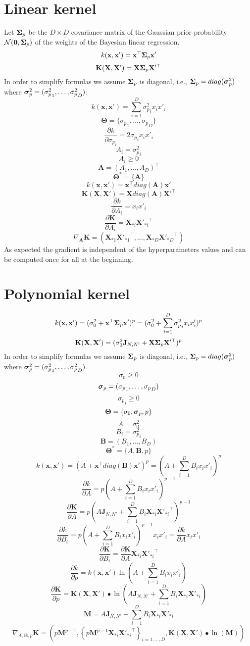 \documentclass[a4paper,11pt]{article}
\newcommand\x{{\mathbf x}}
\newcommand\X{{\mathbf X}}
\newcommand\K{{\mathbf K}}
\newcommand{\Ivec}[1]{\mbox{\boldmath $#1$}}
\begin{document}
\section{Linear kernel}
Let $\Ivec{\Sigma}_p$ be the $D \times D$ covariance matrix of the Gaussian
prior probability $\mathcal{N}(\Ivec{0},\Ivec{\Sigma}_p)$ of the weights of
the Bayesian linear regression.
$$k(\x,\x') = \x^{\top} \Ivec{\Sigma}_p \x'$$
$$\K(\X,\X') = \X \Ivec{\Sigma}_p \X'^{\top}$$
In order to simplify formulas we assume $\Ivec{\Sigma}_p$ is diagonal, i.e.,
$\Ivec{\Sigma}_p = diag(\Ivec{\sigma}^2_p)$ where $\Ivec{\sigma}^2_p =
({\sigma^2_p}_1,\ldots,{\sigma^2_p}_D)$:
$$k(\x,\x') = \sum_{i=1}^D {\sigma^2_p}_i x_i x'_i$$
$$\mathbf{\Theta} = \{{\sigma_p}_1,\ldots,{\sigma_p}_D\}$$
$$\frac{\partial k}{\partial {\sigma_p}_i} = 2 {\sigma_p}_i x_i x'_i$$
$$A_i = {\sigma_p^2}_i$$
$$A_i \ge 0$$
$$\mathbf{A} = (A_1,\ldots,A_D)^{\top}$$
$$\mathbf{\Theta}^* = \{ \mathbf{A} \}$$
$$k(\x,\x') = \x^{\top} diag(\mathbf{A}) \x'$$
$$\K(\X,\X') = \X diag(\mathbf{A}) \X'^{\top}$$
$$\frac{\partial k}{\partial A_i} = x_i x'_i$$
$$\frac{\partial \K}{\partial A_i} = \X_{* i} {\X'_{* i}}^{\top}$$
$$\nabla_{\mathbf{A}} \K = ( \X_{* 1} {\X'_{* 1}}^{\top}, \ldots,
\X_{* D} {\X'_{* D}}^{\top})$$
As expected the gradient is independent of the hyperparameters values
and can be computed once for all at the beginning.

\section{Polynomial kernel}
$$k(\x,\x') = (\sigma_0^2 + \x^{\top} \Ivec{\Sigma}_p \x')^p =
(\sigma_0^2 + \sum_{i=1}^D {\sigma^2_p}_i x_i x'_i)^p$$
$$\K(\X,\X') = (\sigma_0^2 \mathbf{J}_{N,N'} + \X \Ivec{\Sigma}_p
\X'^{\top})^p$$
In order to simplify formulas we assume $\Ivec{\Sigma}_p$ is diagonal, i.e.,
$\Ivec{\Sigma}_p = diag(\Ivec{\sigma}^2_p)$ where $\Ivec{\sigma}^2_p =
({\sigma^2_p}_1,\ldots,{\sigma^2_p}_D)$.
$$\sigma_0 \ge 0$$
$$\Ivec{\sigma}_p = ({\sigma_p}_1,\ldots,{\sigma_p}_D)$$
$${\sigma_p}_i \ge 0$$
$$\mathbf{\Theta} = \{\sigma_0,\Ivec{\sigma}_p, p\}$$
$$A = \sigma_0^2$$
$$B_i = {\sigma^2_p}_i$$
$$\mathbf{B} = (B_1,\ldots,B_D)$$
$$\mathbf{\Theta}^* = \{A,\mathbf{B}, p\}$$
$$k(\x,\x') = (A + \x^{\top} diag(\mathbf{B}) \x')^p = (A +
\sum_{i=1}^D B_i x_i x'_i)^p$$
$$\frac{\partial k}{\partial A} = p(A + \sum_{i=1}^D B_i x_i
x'_i)^{p-1}$$
$$\frac{\partial \K}{\partial A} = p(A\mathbf{J}_{N,N'} + \sum_{i=1}^D
B_i \X_{*i} {\X'_{*i}}^{\top})^{p-1}$$
$$\frac{\partial k}{\partial B_i} = p(A + \sum_{i=1}^D B_i x_i
x'_i)^{p-1} x_i x'_i = \frac{\partial k}{\partial A} x_i x'_i$$
$$\frac{\partial \K}{\partial B_i} = \frac{\partial \K}{\partial A} \X_{*i} {\X'_{*i}}^{\top}$$
$$\frac{\partial k}{\partial p} = k(\x,\x') \ln(A + \sum_{i=1}^D B_i x_i
x'_i)$$
$$\frac{\partial \K}{\partial p} = \K(\X,\X') \bullet \ln(A \mathbf{J}_{N,N'}+ \sum_{i=1}^D B_i \X_{*i} \X'_{*i})$$
$$\mathbf{M} = A \mathbf{J}_{N,N'}+ \sum_{i=1}^D B_i \X_{*i} \X'_{*i}$$
$$\nabla_{A,\mathbf{B},p} \K = \left(p\mathbf{M}^{p-1},\left\{p\mathbf{M}^{p-1} \X_{*i} {\X'_{*i}}^{\top} \right\}_{i=1,\ldots,D}, \K(\X,\X') \bullet \ln(\mathbf{M}) \right)$$
\end{document}
